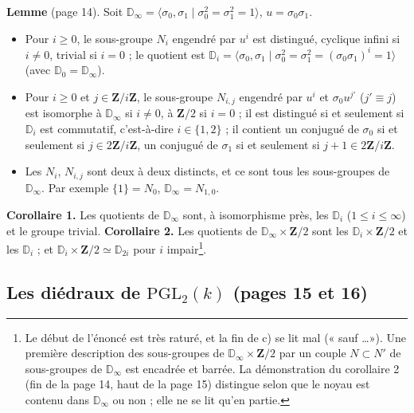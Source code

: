 \documentclass[11pt,a4paper]{article}
\begin{document}
\textbf{Lemme} (page 14). Soit $\mathbb{D}_\infty = \langle \sigma_0, \sigma_1
\mid \sigma_0^2 = \sigma_1^2 = 1\rangle$, $u = \sigma_0\sigma_1$.
\begin{itemize}
  \item[a)] Pour $i \geq 0$, le sous-groupe $N_i$ engendré par $u^i$ est
    distingué, cyclique infini si $i \neq 0$, trivial si $i = 0$ ; le quotient
    est $\mathbb{D}_i = \langle \sigma_0, \sigma_1 \mid \sigma_0^2 = \sigma_1^2
    = (\sigma_0\sigma_1)^i = 1\rangle$ (avec $\mathbb{D}_0 = \mathbb{D}_\infty$).
  \item[b)] Pour $i \geq 0$ et $j \in \mathbf{Z}/i\mathbf{Z}$, le sous-groupe
    $N_{i,j}$ engendré par $u^i$ et $\sigma_0 u^{j'}$ ($j' \equiv j$) est
    isomorphe à $\mathbb{D}_\infty$ si $i \neq 0$, à $\mathbf{Z}/2$ si $i =
    0$ ; il est distingué si et seulement si $\mathbb{D}_i$ est commutatif,
    c'est-à-dire $i \in \{1, 2\}$ ; il contient un conjugué de $\sigma_0$ si
    et seulement si $j \in 2\mathbf{Z}/i\mathbf{Z}$, un conjugué de $\sigma_1$
    si et seulement si $j + 1 \in 2\mathbf{Z}/i\mathbf{Z}$.
  \item[c)] Les $N_i$, $N_{i,j}$ sont deux à deux distincts, et ce sont tous
    les sous-groupes de $\mathbb{D}_\infty$. Par exemple $\{1\} = N_0$,
    $\mathbb{D}_\infty = N_{1,0}$.
\end{itemize}
\textbf{Corollaire 1.} Les quotients de $\mathbb{D}_\infty$ sont, à
isomorphisme près, les $\mathbb{D}_i$ ($1 \leq i \leq \infty$) et le groupe
trivial. \textbf{Corollaire 2.} Les quotients de $\mathbb{D}_\infty \times
\mathbf{Z}/2$ sont les $\mathbb{D}_i \times \mathbf{Z}/2$ et les
$\mathbb{D}_i$ ; et $\mathbb{D}_i \times \mathbf{Z}/2 \simeq \mathbb{D}_{2i}$
pour $i$ impair\footnote{Le début de l'énoncé est très raturé, et la fin de
c) se lit mal (« sauf \ldots »). Une première description des sous-groupes
de $\mathbb{D}_\infty \times \mathbf{Z}/2$ par un couple $N \subset N'$ de
sous-groupes de $\mathbb{D}_\infty$ est encadrée et barrée. La démonstration du
corollaire 2 (fin de la page 14, haut de la page 15) distingue selon que le
noyau est contenu dans $\mathbb{D}_\infty$ ou non ; elle ne se lit qu'en
partie.}.

\subsection*{Les diédraux de $\mathrm{PGL}_2(k)$ (pages 15 et 16)}
\end{document}
